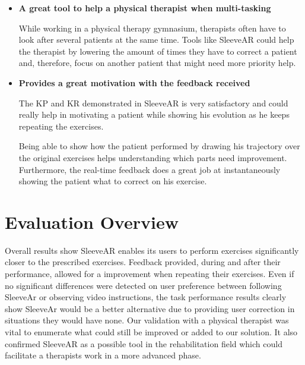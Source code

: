 \begin{itemize}
\item \textbf{A great tool to help a physical therapist when multi-tasking}

While working in a physical therapy gymnasium, therapists often have to look after several patients at the same time. Tools like SleeveAR could help the therapist by lowering the amount of times they have to correct a patient and, therefore, focus on another patient that might need more priority help.


\item \textbf{Provides a great motivation with the feedback received}

The \ac{KP} and \ac{KR} demonstrated in SleeveAR is very satisfactory and could really help in motivating a patient while showing his evolution as he keeps repeating the exercises.

Being able to show how the patient performed by drawing his trajectory over the original exercises helps understanding which parts need improvement. Furthermore, the real-time feedback does a great job at instantaneously showing the patient what to correct on his exercise.

\end{itemize}

\section{Evaluation Overview}

Overall results show SleeveAR enables its users to perform exercises significantly closer to the prescribed exercises. 
Feedback provided, during and after their performance, allowed for a improvement when repeating their exercises. 
Even if no significant differences were detected on user preference between following SleeveAr or observing video instructions, 
the task performance results clearly show SleeveAr would be a better alternative due to providing user correction in situations they would have none.
Our validation with a physical therapist was vital to enumerate what could still be improved or added to our solution. 
It also confirmed SleeveAR as a possible tool in the rehabilitation field which could facilitate a therapists work in a more advanced phase.